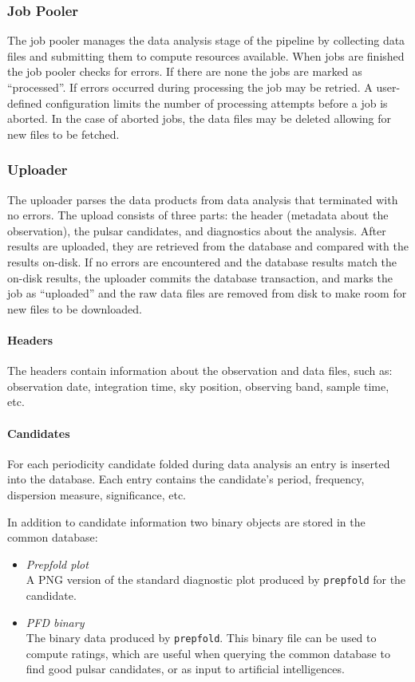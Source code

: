 \documentclass[12pt]{article}
\begin{document}
\subsubsection{Job Pooler}
The job pooler manages the data analysis stage of the pipeline by collecting data files and submitting them to compute resources available. When jobs are finished the job pooler checks for errors. If there are none the jobs are marked as ``processed''. If errors occurred during processing the job may be retried. A user-defined configuration limits the number of processing attempts before a job is aborted. In the case of aborted jobs, the data files may be deleted allowing for new files to be fetched.

\subsubsection{Uploader}
The uploader parses the data products from data analysis that terminated with no errors. The upload consists of three parts: the header (metadata about the observation), the pulsar candidates, and diagnostics about the analysis. After results are uploaded, they are retrieved from the database and compared with the results on-disk. If no errors are encountered and the database results match the on-disk results, the uploader commits the database transaction, and marks the job as ``uploaded'' and the raw data files are removed from disk to make room for new files to be downloaded.

\paragraph{Headers}
The headers contain information about the observation and data files, such as: observation date, integration time, sky position, observing band, sample time, etc.

\paragraph{Candidates}
For each periodicity candidate folded during data analysis an entry is inserted into the database. Each entry contains the candidate's period, frequency, dispersion measure, significance, etc.

In addition to candidate information two binary objects are stored in the common database:
\begin{itemize}
    \item \textit{Prepfold plot} \hfill \\
        A PNG version of the standard diagnostic plot produced by \texttt{prepfold} for the candidate.
    \item \textit{PFD binary} \hfill \\
        The binary data produced by \texttt{prepfold}. This binary file can be used to compute ratings, which are useful when querying the common database to find good pulsar candidates, or as input to artificial intelligences.
\end{itemize}
\end{document}
